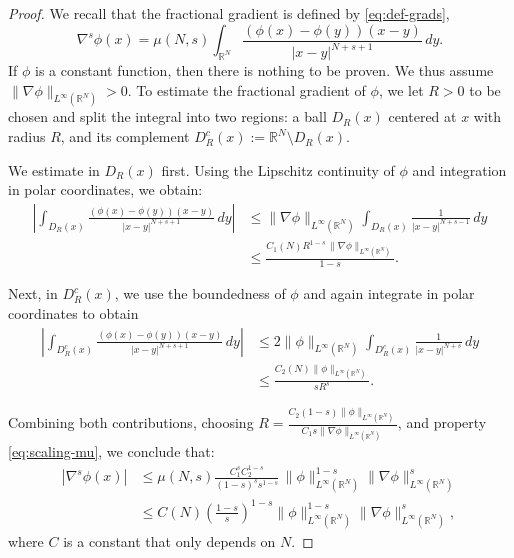 \documentclass[]{amsart}
\theoremstyle{definition}
\theoremstyle{definition}
\theoremstyle{remark}
\numberwithin{equation}{section}
\begin{document}
	\begin{proof}
		We recall that the fractional gradient is defined by \eqref{eq:def-grads}, 
		\[
		\nabla^s \phi(x) = \mu(N,s) \int_{\mathbb{R}^N} \frac{(\phi(x) - \phi(y))(x - y)}{|x - y|^{N + s + 1}} \,dy.
		\]
		If $\phi$ is a constant function, then there is nothing to be proven. We thus assume $\| \nabla \phi \|_{L^\infty(\mathbb{R}^N)} > 0$.
		To estimate the fractional gradient of $\phi$, we let $R>0$ to be chosen and split the integral into two regions: a ball \( D_R(x) \) centered at \( x \) with radius $R$, and its complement \( D_R^c(x):= \mathbb{R}^N \setminus D_R(x) \).
		
		We estimate in  \( D_R(x) \) first. Using the Lipschitz continuity of \( \phi \) and integration in polar coordinates, we obtain:
		\begin{align*}
			\left| \int_{D_R(x)} \frac{(\phi(x) - \phi(y))(x - y)}{|x - y|^{N + s + 1}} \,dy \right|
			&\leq \|\nabla \phi\|_{L^\infty(\mathbb{R}^N)} \int_{D_R(x)} \frac{1}{|x - y|^{N + s - 1}} \,dy \\
			&\leq \frac{C_1(N) R^{1-s} \, \|\nabla \phi\|_{L^\infty(\mathbb{R}^N)}}{1-s}.
		\end{align*}
		
		Next, in \( D_R^c(x) \), we use the boundedness of \( \phi \) and again integrate in polar coordinates to obtain
		\begin{align*}
			\left| \int_{D_R^c(x)} \frac{(\phi(x) - \phi(y))(x - y)}{|x - y|^{N + s + 1}} \,dy \right|
			&\leq 2 \|\phi\|_{L^\infty(\mathbb{R}^N)} \int_{D_R^c(x)} \frac{1}{|x - y|^{N + s}} \,dy \\
			&\leq \frac{C_2(N)\|\phi\|_{L^\infty(\mathbb{R}^N)}}{s R^s}.
		\end{align*}
		
		Combining both contributions, choosing $R = \frac{C_2 (1-s) \|\phi\|_{L^\infty(\mathbb{R}^N)}}{C_1 s \|\nabla \phi\|_{L^\infty(\mathbb{R}^N)}}$, and property \eqref{eq:scaling-mu}, we conclude that:
		\[ \begin{split}
			|\nabla^s \phi(x)| & \leq \mu(N,s) \frac{C_1^s C_2^{1-s}}{(1-s)^s s^{1-s}} \, \|\phi\|_{L^\infty(\mathbb{R}^N)}^{1-s}
			\|\nabla\phi\|_{L^\infty(\mathbb{R}^N)}^{s} \\ &\le C(N) \left(\frac{1-s}{s}\right)^{1-s} \|\phi\|_{L^\infty(\mathbb{R}^N)}^{1-s}
			\|\nabla\phi\|_{L^\infty(\mathbb{R}^N)}^{s},
		\end{split} \]
		where $C$ is a constant that only depends on $N$.
	\end{proof}
	
\end{document}
